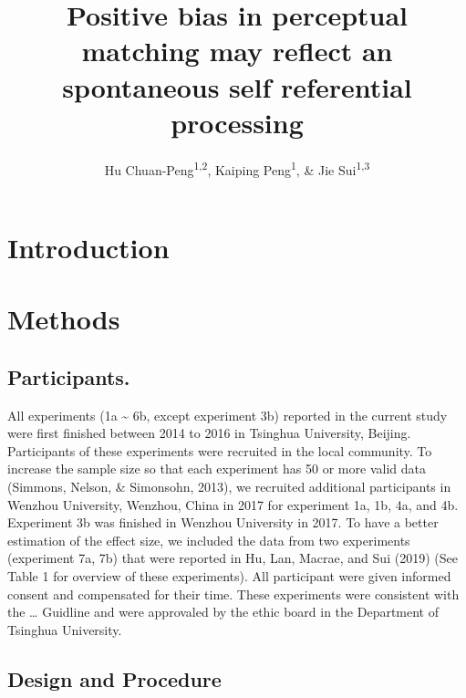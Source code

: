 \documentclass[man]{apa6}
\title{Positive bias in perceptual matching may reflect an spontaneous self referential processing}
\author{Hu Chuan-Peng\textsuperscript{1,2}, Kaiping Peng\textsuperscript{1}, \& Jie Sui\textsuperscript{1,3}}
\date{}
\affiliation{
\vspace{0.5cm}
\textsuperscript{1} Tsinghua University, 100084 Beijing, China\\\textsuperscript{2} German Resilience Center, 55131 Mainz, Germany\\\textsuperscript{3} University of Aberdeen, Aberdeen, Scotland}
\begin{document}
\maketitle

\hypertarget{introduction}{%
\section{Introduction}\label{introduction}}

\hypertarget{methods}{%
\section{Methods}\label{methods}}

\hypertarget{participants.}{%
\subsection{Participants.}\label{participants.}}

All experiments (1a \textasciitilde{} 6b, except experiment 3b) reported in the current study were first finished between 2014 to 2016 in Tsinghua University, Beijing. Participants of these experiments were recruited in the local community. To increase the sample size so that each experiment has 50 or more valid data (Simmons, Nelson, \& Simonsohn, 2013), we recruited additional participants in Wenzhou University, Wenzhou, China in 2017 for experiment 1a, 1b, 4a, and 4b. Experiment 3b was finished in Wenzhou University in 2017. To have a better estimation of the effect size, we included the data from two experiments (experiment 7a, 7b) that were reported in Hu, Lan, Macrae, and Sui (2019) (See Table 1 for overview of these experiments).
All participant were given informed consent and compensated for their time. These experiments were consistent with the \ldots{} Guidline and were approvaled by the ethic board in the Department of Tsinghua University.

\hypertarget{design-and-procedure}{%
\subsection{Design and Procedure}\label{design-and-procedure}}
\end{document}

